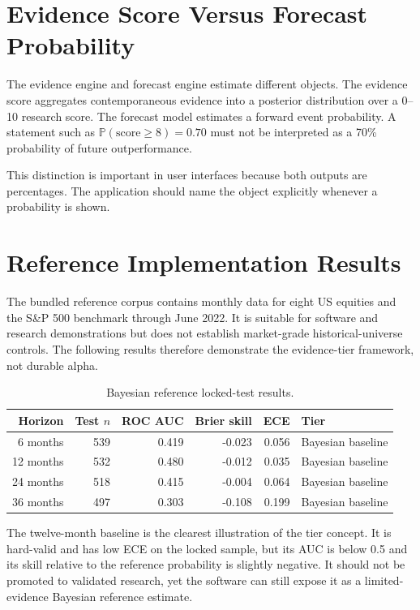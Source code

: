 \documentclass[11pt]{article}
\newcommand{\Prb}{\mathbb{P}}
\begin{document}
\section{Evidence Score Versus Forecast Probability}
The evidence engine and forecast engine estimate different objects. The evidence score aggregates contemporaneous evidence into a posterior distribution over a 0--10 research score. The forecast model estimates a forward event probability. A statement such as $\Prb(\text{score}\ge 8)=0.70$ must not be interpreted as a 70\% probability of future outperformance.

This distinction is important in user interfaces because both outputs are percentages. The application should name the object explicitly whenever a probability is shown.

\section{Reference Implementation Results}
The bundled reference corpus contains monthly data for eight US equities and the S\&P 500 benchmark through June 2022. It is suitable for software and research demonstrations but does not establish market-grade historical-universe controls. The following results therefore demonstrate the evidence-tier framework, not durable alpha.

\begin{table}[ht]
\centering
\caption{Bayesian reference locked-test results.}
\begin{tabular}{rrrrrl}
\toprule
Horizon & Test $n$ & ROC AUC & Brier skill & ECE & Tier\\
\midrule
6 months  & 539 & 0.419 & -0.023 & 0.056 & Bayesian baseline\\
12 months & 532 & 0.480 & -0.012 & 0.035 & Bayesian baseline\\
24 months & 518 & 0.415 & -0.004 & 0.064 & Bayesian baseline\\
36 months & 497 & 0.303 & -0.108 & 0.199 & Bayesian baseline\\
\bottomrule
\end{tabular}
\end{table}

The twelve-month baseline is the clearest illustration of the tier concept. It is hard-valid and has low ECE on the locked sample, but its AUC is below 0.5 and its skill relative to the reference probability is slightly negative. It should not be promoted to validated research, yet the software can still expose it as a limited-evidence Bayesian reference estimate.
\end{document}

